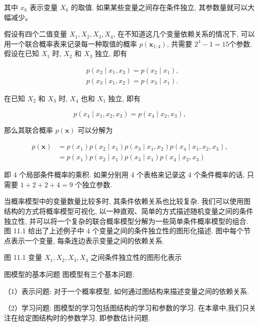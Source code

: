 \documentclass[10pt]{article}
\begin{document}
其中 $x_{k}$ 表示变量 $X_{k}$ 的取值. 如果某些变量之间存在条件独立, 其参数量就可以大幅减少。

假设有四个二值变量 $X_{1}, X_{2}, X_{3}, X_{4}$, 在不知道这几个变量依赖关系的情况下, 可以用一个联合概率表来记录每一种取值的概率 $p\left(\boldsymbol{x}_{1: 4}\right)$, 共需要 $2^{4}-1=15$个参数. 假设在已知 $X_{1}$ 时, $X_{2}$ 和 $X_{3}$ 独立, 即有


\begin{align*}
& p\left(x_{2} \mid x_{1}, x_{3}\right)=p\left(x_{2} \mid x_{1}\right),  \tag{11.3}\\
& p\left(x_{3} \mid x_{1}, x_{2}\right)=p\left(x_{3} \mid x_{1}\right) . \tag{11.4}
\end{align*}


在已知 $X_{2}$ 和 $X_{3}$ 时, $X_{4}$ 也和 $X_{1}$ 独立, 即有


\begin{equation*}
p\left(x_{4} \mid x_{1}, x_{2}, x_{3}\right)=p\left(x_{4} \mid x_{2}, x_{3}\right), \tag{11.5}
\end{equation*}


那么其联合概率 $p(\boldsymbol{x})$ 可以分解为


\begin{align*}
p(\boldsymbol{x}) & =p\left(x_{1}\right) p\left(x_{2} \mid x_{1}\right) p\left(x_{3} \mid x_{1}, x_{2}\right) p\left(x_{4} \mid x_{1}, x_{2}, x_{3}\right),  \tag{11.6}\\
& =p\left(x_{1}\right) p\left(x_{2} \mid x_{1}\right) p\left(x_{3} \mid x_{1}\right) p\left(x_{4} \mid x_{2}, x_{3}\right) \tag{11.7}
\end{align*}


即 4 个局部条件概率的乘积. 如果分别用 4 个表格来记录这 4 个条件概率的话, 只需要 $1+2+2+4=9$ 个独立参数.

当概率模型中的变量数量比较多时, 其条件依赖关系也比较复杂. 我们可以使用图结构的方式将概率模型可视化, 以一种直观、简单的方式描述随机变量之间的条件独立性, 并可以将一个复杂的联合概率模型分解为一些简单条件概率模型的组合. 图 11.1 给出了上述例子中 4 个变量之间的条件独立性的图形化描述. 图中每个节点表示一个变量, 每条连边表示变量之间的依赖关系.



图 11.1 变量 $X_{1}, X_{2}, X_{3}, X_{4}$ 之间条件独立性的图形化表示

图模型的基本问题 图模型有三个基本问题:

（1）表示问题: 对于一个概率模型, 如何通过图结构来描述变量之间的依赖关系.

（2）学习问题: 图模型的学习包括图结构的学习和参数的学习. 在本章中,我们只关注在给定图结构时的参数学习, 即参数估计问题.
\end{document}
